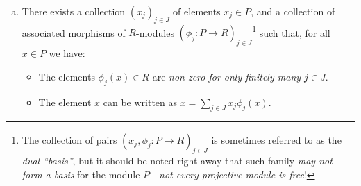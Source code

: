 \begin{proposition}
\begin{enumerate}[(a)]
        \item There exists a collection \((x_j)_{j \in J}\) of elements \(x_j \in P\),
              and a collection of associated morphisms of \(R\)-modules
              \((\phi_j: P \to R)_{j \in J}\)\footnote{The collection of pairs
                  \((x_j, \phi_j: P \to R)_{j \in J}\) is sometimes referred to as the
                  \emph{dual ``basis''}, but it should be noted right away that such family
                  \emph{may not form a basis} for the module \(P\)---\emph{not every
                      projective module is free}!} such that, for all \(x \in P\) we have:
              \begin{itemize}\setlength\itemsep{0em}
                  \item The elements \(\phi_j(x) \in R\) are \emph{non-zero for only finitely many
                            \(j \in J\)}.
                  \item The element \(x\) can be written as \(x = \sum_{j \in J} x_j \phi_j(x)\).
              \end{itemize}
    \end{enumerate}
\end{proposition}

